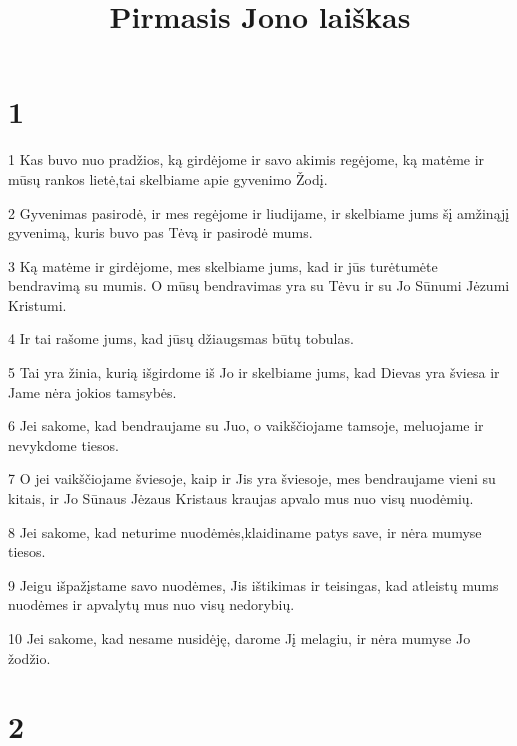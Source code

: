 

\title{Pirmasis Jono laiškas}


\chapter{1}


\par 1 Kas buvo nuo pradžios, ką girdėjome ir savo akimis regėjome, ką matėme ir mūsų rankos lietė,­tai skelbiame apie gyvenimo Žodį. 
\par 2 Gyvenimas pasirodė, ir mes regėjome ir liudijame, ir skelbiame jums šį amžinąjį gyvenimą, kuris buvo pas Tėvą ir pasirodė mums. 
\par 3 Ką matėme ir girdėjome, mes skelbiame jums, kad ir jūs turėtumėte bendravimą su mumis. O mūsų bendravimas yra su Tėvu ir su Jo Sūnumi Jėzumi Kristumi. 
\par 4 Ir tai rašome jums, kad jūsų džiaugsmas būtų tobulas. 
\par 5 Tai yra žinia, kurią išgirdome iš Jo ir skelbiame jums, kad Dievas yra šviesa ir Jame nėra jokios tamsybės. 
\par 6 Jei sakome, kad bendraujame su Juo, o vaikščiojame tamsoje,­ meluojame ir nevykdome tiesos. 
\par 7 O jei vaikščiojame šviesoje, kaip ir Jis yra šviesoje, mes bendraujame vieni su kitais, ir Jo Sūnaus Jėzaus Kristaus kraujas apvalo mus nuo visų nuodėmių. 
\par 8 Jei sakome, kad neturime nuodėmės,­klaidiname patys save, ir nėra mumyse tiesos. 
\par 9 Jeigu išpažįstame savo nuodėmes, Jis ištikimas ir teisingas, kad atleistų mums nuodėmes ir apvalytų mus nuo visų nedorybių. 
\par 10 Jei sakome, kad nesame nusidėję, darome Jį melagiu, ir nėra mumyse Jo žodžio.


\chapter{2}


